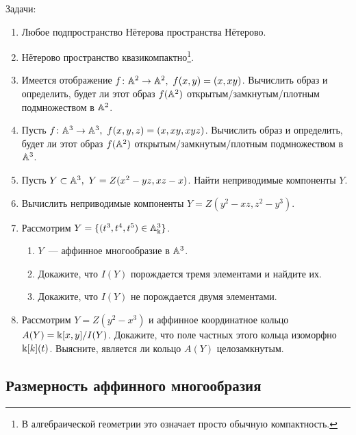 		\begin{homework}\label{hw_1}
		Задачи:
		\begin{enumerate}
			\item Любое подпространство Нётерова пространства Нётерово. 

			\item Нётерово пространство квазикомпактно\footnote{В алгебраической геометрии это означает просто обычную компактность. }. 

			\item Имеется отображение $f\colon \AA^2 \to \AA^2, \ f(x, y) = (x, xy)$. Вычислить образ и определить, будет ли этот образ $f(\AA^2)$ открытым/замкнутым/плотным подмножеством в $\AA^2$. 

			\item Пусть $f\colon \AA^3 \to \AA^3, \ f(x, y, z) = (x, xy, xyz)$. Вычислить образ и определить, будет ли этот образ $f(\AA^2)$ открытым/замкнутым/плотным подмножеством в $\AA^3$. 

			\item Пусть $Y \subset \AA^3, \ Y = Z(x^2 - yz, xz - x)$. Найти неприводимые компоненты $Y$.

			\item Вычислить неприводимые компоненты $Y = Z(y^2 - xz, z^2 - y^3)$.

			\item Рассмотрим $Y = \{ (t^3, t^4, t^5) \in \AA_{\bk}^3 \}$. 
					\begin{enumerate}
						\item $Y$~--- аффинное многообразие в $\AA^3$.

						\item Докажите, что $I(Y)$ порождается тремя элементами и найдите их. 

						\item Докажите, что $I(Y)$ не порождается двумя элементами. 
					\end{enumerate}

			\item Рассмотрим $Y = Z(y^2 - x^3)$ и аффинное координатное кольцо $A(Y) = \bk[x, y]/I(Y)$. Докажите, что поле частных этого кольца изоморфно $\bk[k](t)$. Выясните, является ли кольцо $A(Y)$ целозамкнутым. 


		\end{enumerate}
	\end{homework}

	\subsection{Размерность аффинного многообразия}

